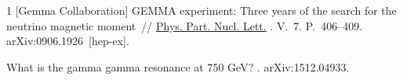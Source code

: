 \documentclass[a4paper]{panl}
\begin{document}
\begin{thebibliography}{1}
 [Gemma Collaboration] {GEMMA experiment: Three years
  of the search for the neutrino magnetic moment}~//
  \href{http://dx.doi.org/10.1134/S1547477110060063}{Phys. Part. Nucl. Lett.}
  \BibDash
{}. \BibDash
\newblock V.~7. \BibDash
\newblock P.~406--409. \BibDash
\newblock arXiv:0906.1926~[hep-ex].

 {What is the gamma
  gamma resonance at 750 GeV?} \BibDash
{}. \BibDash
\newblock arXiv:1512.04933.

\end{thebibliography}
\end{document}
